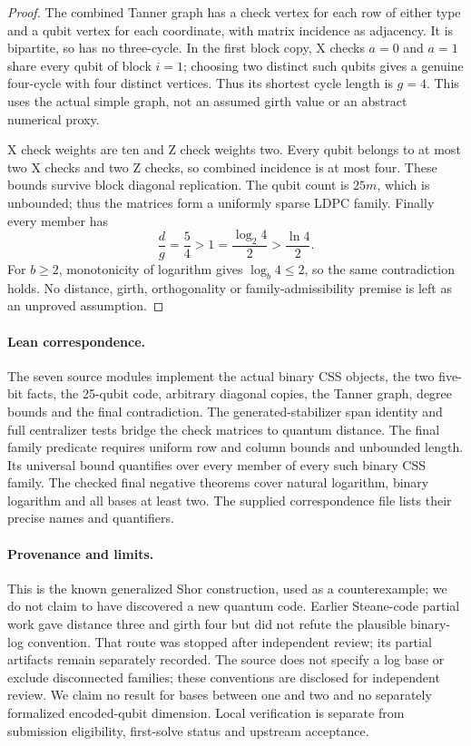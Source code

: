 \documentclass[11pt]{article}
\begin{document}
\begin{proof}
The combined Tanner graph has a check vertex for each row of either type
and a qubit vertex for each coordinate, with matrix incidence as adjacency.
It is bipartite, so has no three-cycle. In the first block copy, X checks
$a=0$ and $a=1$ share every qubit of block $i=1$; choosing two distinct such
qubits gives a genuine four-cycle with four distinct vertices. Thus its
shortest cycle length is $g=4$. This uses the actual simple graph, not an
assumed girth value or an abstract numerical proxy.

X check weights are ten and Z check weights two. Every qubit belongs to at
most two X checks and two Z checks, so combined incidence is at most four.
These bounds survive block diagonal replication. The qubit count is $25m$,
which is unbounded; thus the matrices form a uniformly sparse LDPC family.
Finally every member has
\[
 \frac d g=\frac54>1=\frac{\log_2 4}{2}
             >\frac{\ln4}{2}.
\]
For $b\ge2$, monotonicity of logarithm gives $\log_b4\le2$, so the same
contradiction holds. No distance, girth, orthogonality or family-admissibility
premise is left as an unproved assumption.
\end{proof}

\paragraph{Lean correspondence.}
The seven source modules implement the actual binary CSS objects, the two
five-bit facts, the 25-qubit code, arbitrary diagonal copies, the Tanner
graph, degree bounds and the final contradiction. The generated-stabilizer
span identity and full centralizer tests bridge the check matrices to quantum
distance. The final family predicate requires uniform row and column bounds
and unbounded length. Its universal bound quantifies over every member of
every such binary CSS family. The checked final negative theorems cover
natural logarithm, binary logarithm and all bases at least two. The supplied
correspondence file lists their precise names and quantifiers.

\paragraph{Provenance and limits.}
This is the known generalized Shor construction, used as a counterexample;
we do not claim to have discovered a new quantum code. Earlier Steane-code
partial work gave distance three and girth four but did not refute the
plausible binary-log convention. That route was stopped after independent
review; its partial artifacts remain separately recorded. The source does
not specify a log base or exclude disconnected families; these conventions
are disclosed for independent review. We claim no result for bases between
one and two and no separately formalized encoded-qubit dimension. Local
verification is separate from submission eligibility, first-solve status and
upstream acceptance.
\end{document}
